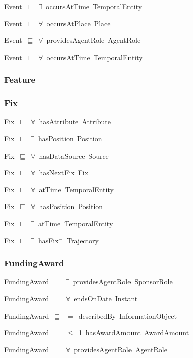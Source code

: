 \documentclass{article}
\begin{document}
Event~\ensuremath{\sqsubseteq}~\ensuremath{\exists}~occursAtTime~TemporalEntity~

Event~\ensuremath{\sqsubseteq}~\ensuremath{\forall}~occursAtPlace~Place~

Event~\ensuremath{\sqsubseteq}~\ensuremath{\forall}~providesAgentRole~AgentRole~

Event~\ensuremath{\sqsubseteq}~\ensuremath{\forall}~occursAtTime~TemporalEntity~

\subsubsection*{Feature}

\subsubsection*{Fix}

Fix~\ensuremath{\sqsubseteq}~\ensuremath{\forall}~hasAttribute~Attribute~

Fix~\ensuremath{\sqsubseteq}~\ensuremath{\exists}~hasPosition~Position~

Fix~\ensuremath{\sqsubseteq}~\ensuremath{\forall}~hasDataSource~Source~

Fix~\ensuremath{\sqsubseteq}~\ensuremath{\forall}~hasNextFix~Fix~

Fix~\ensuremath{\sqsubseteq}~\ensuremath{\forall}~atTime~TemporalEntity~

Fix~\ensuremath{\sqsubseteq}~\ensuremath{\forall}~hasPosition~Position~

Fix~\ensuremath{\sqsubseteq}~\ensuremath{\exists}~atTime~TemporalEntity~

Fix~\ensuremath{\sqsubseteq}~\ensuremath{\exists}~hasFix\ensuremath{^-}~Trajectory~

\subsubsection*{FundingAward}

FundingAward~\ensuremath{\sqsubseteq}~\ensuremath{\exists}~providesAgentRole~SponsorRole~

FundingAward~\ensuremath{\sqsubseteq}~\ensuremath{\forall}~endsOnDate~Instant~

FundingAward~\ensuremath{\sqsubseteq}~\ensuremath{=}~describedBy~InformationObject~

FundingAward~\ensuremath{\sqsubseteq}~\ensuremath{\leq}~1~hasAwardAmount~AwardAmount~

FundingAward~\ensuremath{\sqsubseteq}~\ensuremath{\forall}~providesAgentRole~AgentRole~
\end{document}
